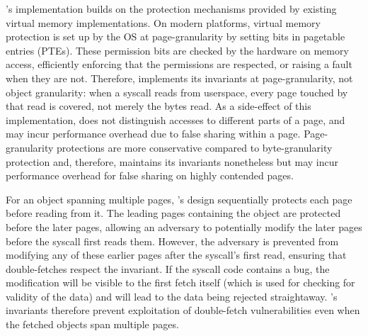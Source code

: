 \documentclass[letterpaper,twocolumn,10pt, anonymous]{article}
\begin{document}
\tiktok's implementation builds on the protection mechanisms provided by 
existing virtual memory implementations.
On modern platforms, virtual memory protection is set up by the OS at
page-granularity by setting bits in pagetable entries (PTEs).
These permission bits are checked by the hardware on memory access, 
efficiently enforcing that the permissions are respected, or raising 
a fault when they are not.
Therefore, \tiktok implements its invariants at page-granularity, not object 
granularity: when a syscall reads from userspace, every page touched by that 
read is covered, not merely the bytes read.
As a side-effect of this implementation, \tiktok does not distinguish
accesses to different parts of a page, and may incur performance overhead due
to false sharing within a page. 
Page-granularity protections are more conservative compared to byte-granularity
protection and, therefore, \tiktok maintains its invariants nonetheless but may
incur performance overhead for false sharing on highly contended pages.

For an object spanning multiple pages, \tiktok's design sequentially 
protects each page before reading from it.
The leading pages containing the object are protected before the
later pages, allowing an adversary to potentially modify the later 
pages before the syscall first reads them.
However, the adversary is prevented from modifying any of these earlier pages
after the syscall's first read, ensuring that double-fetches respect
the invariant.
If the syscall code contains a \tocttou bug, the modification will
be visible to the first fetch itself (which is used for checking for 
validity of the data) and will lead to the data being rejected 
straightaway.
\tiktok's invariants therefore prevent exploitation of double-fetch
vulnerabilities even when the fetched objects span multiple pages.
\end{document}
